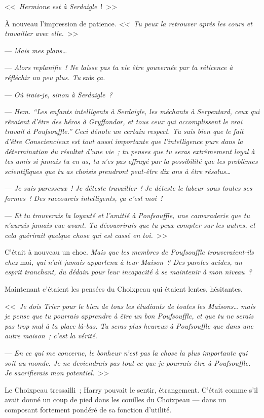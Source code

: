 <<~\emph{Hermione est à Serdaigle}~!~>>

À nouveau l'impression de patience. \emph{<<~Tu peux la retrouver après les cours et travailler avec elle.}~>>

--- \emph{Mais mes plans…}

--- \emph{Alors replanifie~! Ne laisse pas ta vie être gouvernée par ta réticence à réfléchir un peu plus. Tu} sais \emph{ça.}

--- \emph{Où irais-je, sinon à Serdaigle~?}

--- \emph{Hem. “Les enfants intelligents à Serdaigle, les méchants à Serpentard, ceux qui rêvaient d'être des héros à Gryffondor, et tous ceux qui accomplissent le vrai travail à Poufsouffle.” Ceci dénote un certain respect. Tu sais bien que le fait d'être Consciencieux est tout aussi importante que l'intelligence pure dans la détermination du résultat d'une vie~; tu penses que tu seras extrêmement loyal à tes amis si jamais tu en as, tu n'es pas effrayé par la possibilité que les problèmes scientifiques que tu as choisis prendront peut-être dix ans à être résolus…}

--- \emph{Je suis paresseux~! Je déteste travailler~! Je déteste le labeur sous toutes ses formes~! Des raccourcis intelligents, ça c'est moi~!}

--- \emph{Et tu trouverais la loyauté et l'amitié à Poufsouffle, une camaraderie que tu n'aurais jamais eue avant. Tu découvrirais que tu peux compter sur les autres, et cela guérirait quelque chose qui est cassé en toi.}~>>

C'était à nouveau un choc. \emph{Mais que les membres de Poufsouffle trouveraient-ils chez} moi\emph{, qui n'ait jamais appartenu à leur Maison~? Des paroles acides, un esprit tranchant, du dédain pour leur incapacité à se maintenir à mon niveau~?}

Maintenant c'étaient les pensées du Choixpeau qui étaient lentes, hésitantes.

<<~\emph{Je dois Trier pour le bien de tous les étudiants de toutes les Maisons… mais je pense que tu pourrais apprendre à être un bon Poufsouffle, et que tu ne serais pas trop mal à ta place là-bas. Tu seras plus heureux à Poufsouffle que dans une autre maison~; c'est la vérité.}

--- \emph{En ce qui me concerne, le bonheur n'est pas la chose la plus importante qui soit au monde. Je ne deviendrais pas tout ce que je pourrais être à Poufsouffle. Je sacrifierais mon potentiel.}~>>

Le Choixpeau tressailli~; Harry pouvait le sentir, étrangement. C'était comme s'il avait donné un coup de pied dans les couilles du Choixpeau — dans un composant fortement pondéré de sa fonction d'utilité.

